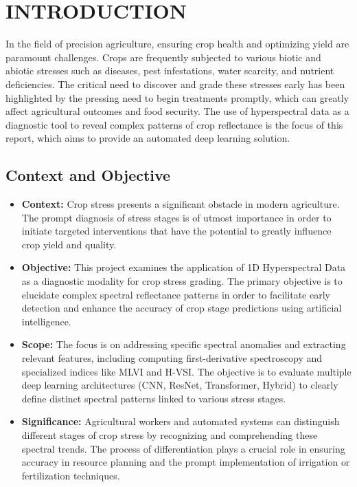 \documentclass[ 12pt,a4paper,twocolumn,fleqn]{report}
\begin{document}
\newpage
    \pagestyle{combined}

\tableofcontents
\newpage
\listoffigures
\newpage
\listoftables
\newpage
{}
\chapter{INTRODUCTION}
In the field of precision agriculture, ensuring crop health and optimizing yield are paramount challenges. Crops are frequently subjected to various biotic and abiotic stresses such as diseases, pest infestations, water scarcity, and nutrient deficiencies. The critical need to discover and grade these stresses early has been highlighted by the pressing need to begin treatments promptly, which can greatly affect agricultural outcomes and food security. The use of hyperspectral data as a diagnostic tool to reveal complex patterns of crop reflectance is the focus of this report, which aims to provide an automated deep learning solution.

\section{Context and Objective}
\vspace{2mm}
\begin{itemize}
    \item \textbf{Context:} Crop stress presents a significant obstacle in modern agriculture. The prompt diagnosis of stress stages is of utmost importance in order to initiate targeted interventions that have the potential to greatly influence crop yield and quality.
    \item \textbf{Objective:} This project examines the application of 1D Hyperspectral Data as a diagnostic modality for crop stress grading. The primary objective is to elucidate complex spectral reflectance patterns in order to facilitate early detection and enhance the accuracy of crop stage predictions using artificial intelligence.
    \item \textbf{Scope:} The focus is on addressing specific spectral anomalies and extracting relevant features, including computing first-derivative spectroscopy and specialized indices like MLVI and H-VSI. The objective is to evaluate multiple deep learning architectures (CNN, ResNet, Transformer, Hybrid) to clearly define distinct spectral patterns linked to various stress stages.
    \item \textbf{Significance:} Agricultural workers and automated systems can distinguish different stages of crop stress by recognizing and comprehending these spectral trends. The process of differentiation plays a crucial role in ensuring accuracy in resource planning and the prompt implementation of irrigation or fertilization techniques.
\end{itemize}
\end{document}
